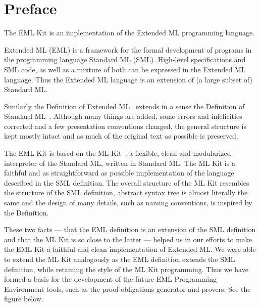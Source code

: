 \part*{Preface}
\label{sec:preface}

The EML Kit is an implementation of the Extended ML programming language.

Extended ML (EML) is a framework for the formal development of programs
in the programming language Standard ML (SML). High-level specifications and
SML code, as well as a mixture of both can be expressed in 
the Extended ML language. Thus the Extended ML language is 
an extension of (a large subset of) Standard ML.

Similarly the Definition of Extended ML~\cite{bib:KST94} extends in a sense
the Definition of Standard ML~\cite{MTH90}. Although many things are added,
some errors and infelicities corrected and a few presentation 
conventions changed, the general structure is kept mostly intact 
and as much of the original text as possible is preserved. 

The EML Kit is based on the ML Kit~\cite{BRTT93}; a flexible, clean and
modularized interpreter of the Standard ML, written in Standard ML.
The ML Kit is a faithful and as straightforward as possible 
implementation of the language described in the SML definition. The overall structure 
of the ML Kit resembles the structure of the SML definition,
abstract syntax tree is almost literally the same and
the design of many details, such as naming conventions,
is inspired by the Definition. 

These two facts --- that the EML definition is an extension of 
the SML definition and that the ML Kit is so close to the latter --- 
helped us in our efforts to make the EML Kit a faithful and clean 
implementation of Extended ML. We were able to extend the ML Kit
analogously as the EML definition extends the SML definition,
while retaining the style of the ML Kit programming.
Thus we have formed a basis for the development of the future EML Programming
Environment tools, such as the proof-obligations generator and provers.
See the figure below.

\vspace{10pt}

